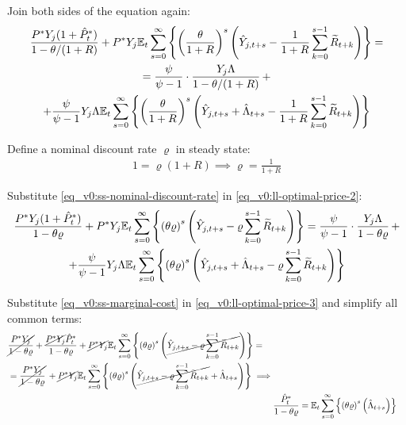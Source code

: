 \documentclass[
thesis.tex
]{subfiles}
\begin{document}
	Join both sides of the equation again:
	\begin{multline}
		\frac{ P^\ast Y_{j} ( 1 + \hat{P}_t^\ast ) }{1-\theta /(1+R)} + P^\ast Y_{j} {\mathbb{E}_{t}} \sum_{s=0}^{\infty} \left\{ \left( \frac{\theta}{1 + R} \right)^s \left( \hat{Y}_{j,t+s} - \frac{1}{1 + R} \sum_{k=0}^{s-1} \widetilde{R}_{t+k} \right) \right\} = 
		\\
		= \frac{\psi}{\psi-1} \cdot \frac{Y_{j} \Lambda}{1-\theta /(1+R)} \, + 
		\\
		+ \frac{\psi}{\psi-1} Y_{j} \Lambda {\mathbb{E}_{t}} \sum_{s=0}^{\infty} \left\{ \left( \frac{\theta}{1 + R} \right)^s \left( \hat{Y}_{j,t+s} + \hat{\Lambda}_{t+s} - \frac{1}{1 + R} \sum_{k=0}^{s-1} \widetilde{R}_{t+k} \right) \right\} \label{eq_v0:ll-optimal-price-2}
	\end{multline}
	
	Define a nominal discount rate $\varrho$ in steady state:
	\begin{align}
		1 = \varrho (1 + R) \implies \varrho = \frac{1}{1 + R} \label{eq_v0:ss-nominal-discount-rate}
	\end{align}
	
	Substitute \ref{eq_v0:ss-nominal-discount-rate} in \ref{eq_v0:ll-optimal-price-2}:
	\begin{multline}
		\frac{ P^\ast Y_{j} ( 1 + \hat{P}_t^\ast ) }{1- \theta \varrho} + P^\ast Y_{j} {\mathbb{E}_{t}} \sum_{s=0}^{\infty} \left\{ \left( \theta \varrho \right)^s \left( \hat{Y}_{j,t+s} - \varrho \sum_{k=0}^{s-1} \widetilde{R}_{t+k} \right) \right\} = \frac{\psi}{\psi-1} \cdot \frac{Y_{j} \Lambda}{1- \theta \varrho } \, + 
		\\ 
		+ \frac{\psi}{\psi-1} Y_{j} \Lambda {\mathbb{E}_{t}} \sum_{s=0}^{\infty} \left\{ \left( \theta \varrho \right)^s \left( \hat{Y}_{j,t+s} + \hat{\Lambda}_{t+s} - \varrho \sum_{k=0}^{s-1} \widetilde{R}_{t+k} \right) \right\} \label{eq_v0:ll-optimal-price-3}
	\end{multline}
	
	Substitute \ref{eq_v0:ss-marginal-cost} in \ref{eq_v0:ll-optimal-price-3} and simplify all common terms:
	\begin{align}
		\begin{split}
			& \cancel{\frac{P^\ast Y_{j}}{1-\theta\varrho}} + \frac{ \cancel{P^\ast Y_{j}} \hat{P}_t^\ast }{1- \theta \varrho} + \cancel{P^\ast Y_{j}} {\mathbb{E}_{t}} \sum_{s=0}^{\infty} \left\{ \left( \theta \varrho \right)^s \left( \cancel{\hat{Y}_{j,t+s} - \varrho \sum_{k=0}^{s-1} \widetilde{R}_{t+k}} \right) \right\} = 
			\\
			& = \cancel{\frac{P^\ast Y_{j}}{1-\theta\varrho}} \, + \cancel{P^\ast Y_{j}} {\mathbb{E}_{t}} \sum_{s=0}^{\infty} \left\{ \left( \theta \varrho \right)^s \left( \cancel{\hat{Y}_{j,t+s} - \varrho \sum_{k=0}^{s-1} \widetilde{R}_{t+k}} + \hat{\Lambda}_{t+s} \right) \right\} \implies	
		\end{split} \nonumber \\
		& \frac{ \hat{P}_t^\ast }{1- \theta \varrho} = {\mathbb{E}_{t}} \sum_{s=0}^{\infty} \left\{ \left( \theta \varrho \right)^s \left( \hat{\Lambda}_{t+s} \right) \right\} \label{eq_v0:ll-optimal-price-4}
	\end{align}
	
\end{document}
